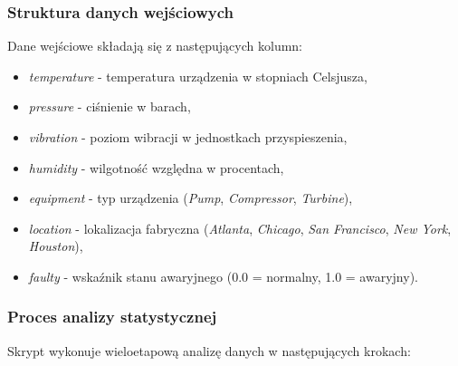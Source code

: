 \subsubsection{Struktura danych wejściowych}

Dane wejściowe składają się z następujących kolumn:
\begin{itemize}
    \item \textit{temperature} - temperatura urządzenia w stopniach Celsjusza,
    \item \textit{pressure} - ciśnienie w barach,
    \item \textit{vibration} - poziom wibracji w jednostkach przyspieszenia,
    \item \textit{humidity} - wilgotność względna w procentach,
    \item \textit{equipment} - typ urządzenia (\textit{Pump}, \textit{Compressor}, \textit{Turbine}),
    \item \textit{location} - lokalizacja fabryczna (\textit{Atlanta}, \textit{Chicago}, \textit{San Francisco}, \textit{New York}, \textit{Houston}),
    \item \textit{faulty} - wskaźnik stanu awaryjnego (0.0 = normalny, 1.0 = awaryjny).
\end{itemize}

\subsubsection{Proces analizy statystycznej}

Skrypt wykonuje wieloetapową analizę danych w następujących krokach:

